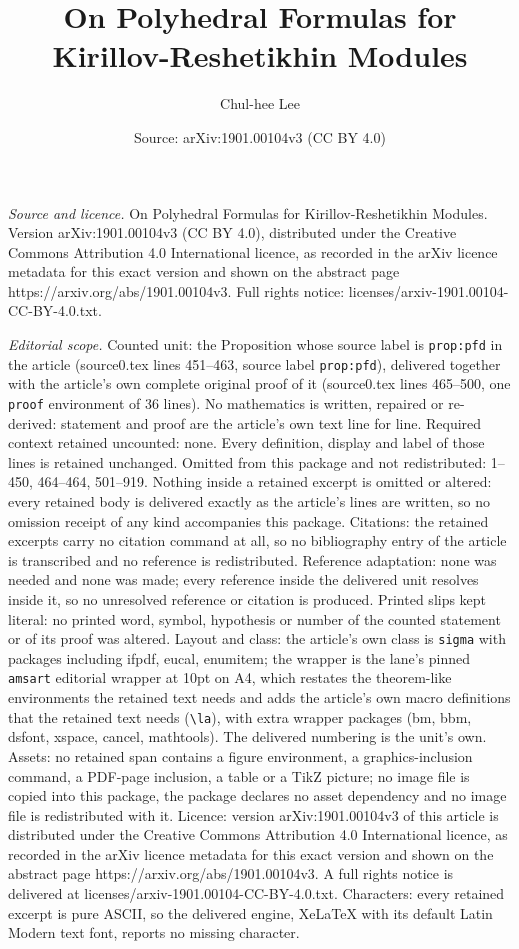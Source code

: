 \documentclass[10pt,a4paper]{amsart}
\title[On Polyhedral Formulas for Kirillov-Reshetikhin Modules]{On Polyhedral Formulas for Kirillov-Reshetikhin Modules}
\author{Chul-hee Lee}
\date{Source: arXiv:1901.00104v3 (CC BY 4.0)}
\begin{document}
\maketitle

\noindent\emph{Source and licence.} On Polyhedral Formulas for Kirillov-Reshetikhin Modules. Version arXiv:1901.00104v3 (CC BY 4.0), distributed under the Creative Commons Attribution 4.0 International licence, as recorded in the arXiv licence metadata for this exact version and shown on the abstract page https://arxiv.org/abs/1901.00104v3. Full rights notice: licenses/arxiv-1901.00104-CC-BY-4.0.txt.\par\smallskip

\noindent\textit{Editorial scope.} Counted unit: the Proposition whose source label is \texttt{prop:pfd} in the article (source0.tex lines 451--463, source label \texttt{prop:pfd}), delivered together with the article's own complete original proof of it (source0.tex lines 465--500, one \texttt{proof} environment of 36 lines). No mathematics is written, repaired or re-derived: statement and proof are the article's own text line for line. Required context retained uncounted: none. Every definition, display and label of those lines is retained unchanged. Omitted from this package and not redistributed: 1--450, 464--464, 501--919. Nothing inside a retained excerpt is omitted or altered: every retained body is delivered exactly as the article's lines are written, so no omission receipt of any kind accompanies this package. Citations: the retained excerpts carry no citation command at all, so no bibliography entry of the article is transcribed and no reference is redistributed. Reference adaptation: none was needed and none was made; every reference inside the delivered unit resolves inside it, so no unresolved reference or citation is produced. Printed slips kept literal: no printed word, symbol, hypothesis or number of the counted statement or of its proof was altered. Layout and class: the article's own class is \texttt{sigma} with packages including ifpdf, eucal, enumitem; the wrapper is the lane's pinned \texttt{amsart} editorial wrapper at 10pt on A4, which restates the theorem-like environments the retained text needs and adds the article's own macro definitions that the retained text needs (\texttt{\textbackslash la}), with extra wrapper packages (bm, bbm, dsfont, xspace, cancel, mathtools). The delivered numbering is the unit's own. Assets: no retained span contains a figure environment, a graphics-inclusion command, a PDF-page inclusion, a table or a TikZ picture; no image file is copied into this package, the package declares no asset dependency and no image file is redistributed with it. Licence: version arXiv:1901.00104v3 of this article is distributed under the Creative Commons Attribution 4.0 International licence, as recorded in the arXiv licence metadata for this exact version and shown on the abstract page https://arxiv.org/abs/1901.00104v3. A full rights notice is delivered at licenses/arxiv-1901.00104-CC-BY-4.0.txt. Characters: every retained excerpt is pure ASCII, so the delivered engine, XeLaTeX with its default Latin Modern text font, reports no missing character.
\end{document}
